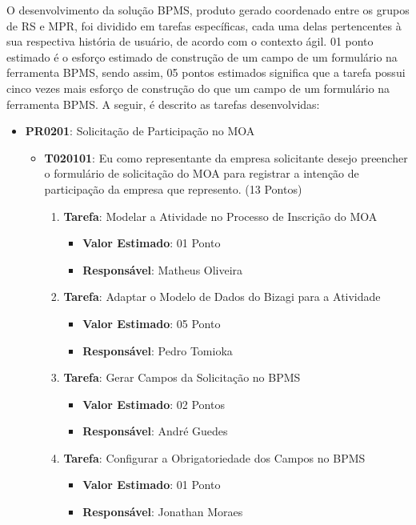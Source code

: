 O desenvolvimento da solução BPMS, produto gerado coordenado entre os grupos de RS e MPR, foi dividido em tarefas específicas, cada uma delas pertencentes à sua respectiva história de usuário, de acordo com o contexto ágil. 01 ponto estimado é o esforço estimado de construção de um campo de um formulário na ferramenta BPMS, sendo assim, 05 pontos estimados significa que a tarefa possui cinco vezes mais esforço de construção do que um campo de um formulário na ferramenta BPMS. A seguir, é descrito as tarefas desenvolvidas:
\begin{itemize}
	\item{\textbf{PR0201}: Solicitação de Participação no MOA
		\begin{itemize}
			\item{\textbf{T020101}: Eu como representante da empresa solicitante desejo preencher o formulário de solicitação do MOA para registrar a intenção de participação da empresa que represento. (13 Pontos)
			\begin{enumerate}
				\item{\textbf{Tarefa}: Modelar a Atividade no Processo de Inscrição do MOA
					\begin{itemize}
						\item{\textbf{Valor Estimado}: 01 Ponto}
						\item{\textbf{Responsável}: Matheus Oliveira}
					\end{itemize}}
				\item{\textbf{Tarefa}: Adaptar o Modelo de Dados do Bizagi para a Atividade
					\begin{itemize}
						\item{\textbf{Valor Estimado}: 05 Ponto}
						\item{\textbf{Responsável}: Pedro Tomioka}
					\end{itemize}}
				\item{\textbf{Tarefa}: Gerar Campos da Solicitação no BPMS
					\begin{itemize}
						\item{\textbf{Valor Estimado}: 02 Pontos}
						\item{\textbf{Responsável}: André Guedes}
					\end{itemize}}
				\item{\textbf{Tarefa}: Configurar a Obrigatoriedade dos Campos no BPMS
					\begin{itemize}
						\item{\textbf{Valor Estimado}: 01 Ponto}
						\item{\textbf{Responsável}: Jonathan Moraes}

\end{itemize}}
\end{enumerate}}
\end{itemize}}
\end{itemize}
